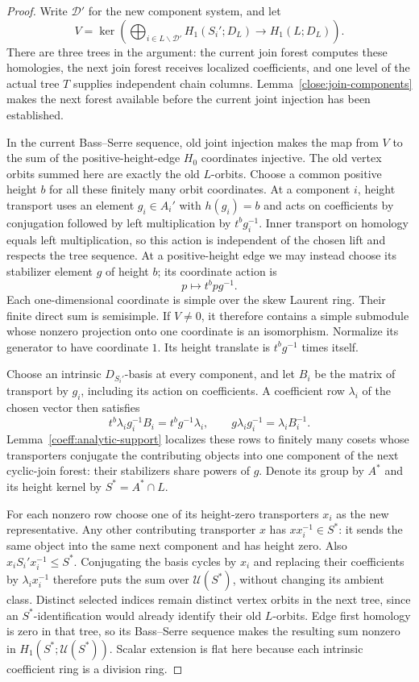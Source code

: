 \begin{proof}
Write $\mathcal D'$ for the new component system, and let
\[
 V=\ker\left(\bigoplus_{i\in L\backslash\mathcal D'}
       H_1(S_i';D_L)\longrightarrow H_1(L;D_L)\right).
\]
There are three trees in the argument: the current join forest
computes these homologies, the next join forest receives localized
coefficients, and one level of the actual tree $T$ supplies independent
chain columns. Lemma~\ref{close:join-components} makes the next forest
available before the current joint injection has been established.

In the current Bass--Serre sequence, old joint injection makes the
map from $V$ to the sum of the positive-height-edge $H_0$ coordinates
injective. The old vertex orbits summed here are exactly the old
$L$-orbits. Choose a common positive height $b$ for all these finitely
many orbit coordinates. At a component $i$, height transport uses an
element $g_i\in A_i'$ with $h(g_i)=b$ and acts on coefficients by
conjugation followed by left multiplication by $t^bg_i^{-1}$.
Inner transport on homology equals left multiplication, so this action
is independent of the chosen lift and respects the tree sequence.
At a positive-height edge we may instead choose its stabilizer
element $g$ of height $b$; its coordinate action is
\[
 p\longmapsto t^bpg^{-1}.
\]
Each one-dimensional coordinate is simple over the skew Laurent ring.
Their finite direct sum is semisimple. If $V\ne0$, it therefore
contains a simple submodule whose nonzero projection onto one
coordinate is an isomorphism. Normalize its generator to have
coordinate $1$. Its height translate is $t^bg^{-1}$ times itself.

Choose an intrinsic $D_{S_i'}$-basis at every component, and let $B_i$
be the matrix of transport by $g_i$, including its action on
coefficients. A coefficient row $\lambda_i$ of the chosen vector
then satisfies
\[
 t^b\lambda_i g_i^{-1}B_i=t^bg^{-1}\lambda_i,
 \qquad
 g\lambda_i g_i^{-1}=\lambda_iB_i^{-1}.
\]
Lemma~\ref{coeff:analytic-support} localizes these rows to finitely
many cosets whose transporters conjugate the contributing objects
into one component of the next cyclic-join forest: their stabilizers
share powers of $g$. Denote its group by $A^*$ and its height kernel
by $S^*=A^*\cap L$.

For each nonzero row choose one of its height-zero transporters $x_i$
as the new representative. Any other contributing transporter $x$
has $xx_i^{-1}\in S^*$: it sends the same object into the same next
component and has height zero. Also $x_iS_i'x_i^{-1}\le S^*$.
Conjugating the basis cycles by $x_i$ and replacing their coefficients
by $\lambda_i x_i^{-1}$ therefore puts the sum over
$\mathcal U(S^*)$, without changing its ambient class. Distinct
selected indices remain distinct vertex orbits in the next tree,
since an $S^*$-identification would already identify their old
$L$-orbits. Edge first homology is zero in that tree, so its
Bass--Serre sequence makes the resulting sum nonzero in
$H_1(S^*;\mathcal U(S^*))$. Scalar extension is flat here because
each intrinsic coefficient ring is a division ring.


\end{proof}
